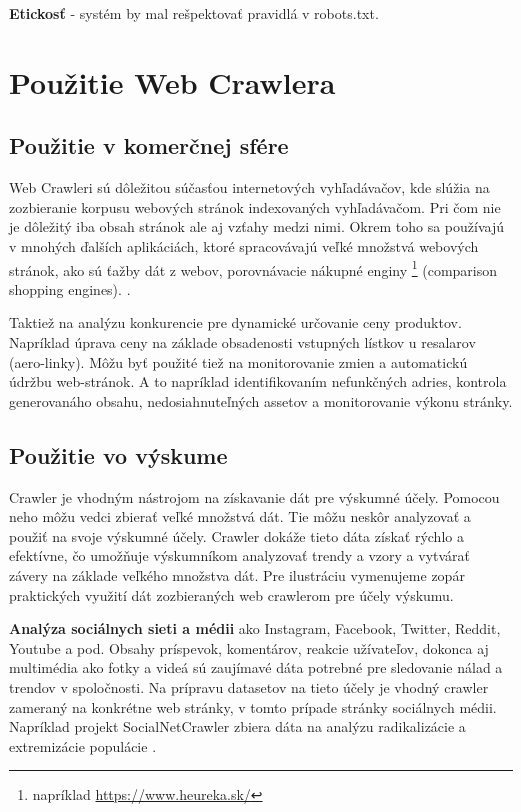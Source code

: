 \textbf{Etickosť} - systém by mal rešpektovať pravidlá v robots.txt.

\section{Použitie Web Crawlera}

\subsection{Použitie v komerčnej sfére}
Web Crawleri sú dôležitou súčasťou internetových vyhľadávačov, kde slúžia na zozbieranie korpusu webových stránok indexovaných vyhľadávačom. Pri čom nie je dôležitý iba obsah stránok ale aj vzťahy medzi nimi. Okrem toho sa používajú v mnohých ďalších aplikáciách, ktoré spracovávajú veľké množstvá webových stránok, ako sú ťažby dát z webov, porovnávacie nákupné enginy \footnote{ napríklad \url{https://www.heureka.sk/}} (comparison shopping engines). \cite{encykOfDatabases}.  

Taktiež na analýzu konkurencie pre dynamické určovanie ceny produktov. Napríklad úprava ceny na základe obsadenosti vstupných lístkov u resalarov (aero-linky). 
Môžu byť použité tiež na monitorovanie zmien a automatickú údržbu web-stránok. A to napríklad identifikovaním nefunkčných adries, kontrola generovanáho obsahu, nedosiahnuteľných assetov a monitorovanie výkonu stránky. \cite{crawlPageTesting}

\subsection{Použitie vo výskume}
Crawler je vhodným nástrojom na získavanie dát pre výskumné účely. Pomocou neho môžu vedci zbierať veľké množstvá dát. Tie môžu neskôr analyzovať a použiť na svoje výskumné účely. Crawler dokáže tieto dáta získať rýchlo a efektívne, čo umožňuje výskumníkom analyzovať trendy a vzory a vytvárať závery na základe veľkého množstva dát. Pre ilustráciu vymenujeme zopár praktických využití dát zozbieraných web crawlerom pre účely výskumu. 

\textbf{Analýza sociálnych sieti a médii} ako Instagram, Facebook, Twitter, Reddit, Youtube a pod. Obsahy príspevok, komentárov, reakcie užívateľov, dokonca aj multimédia ako fotky a videá sú zaujímavé dáta potrebné pre sledovanie nálad a trendov v spoločnosti. Na prípravu datasetov na tieto účely je vhodný crawler zameraný na konkrétne web stránky, v tomto prípade stránky sociálnych médii. Napríklad projekt SocialNetCrawler zbiera dáta na analýzu radikalizácie a extremizácie populácie \cite{socialNetCrawler}.

